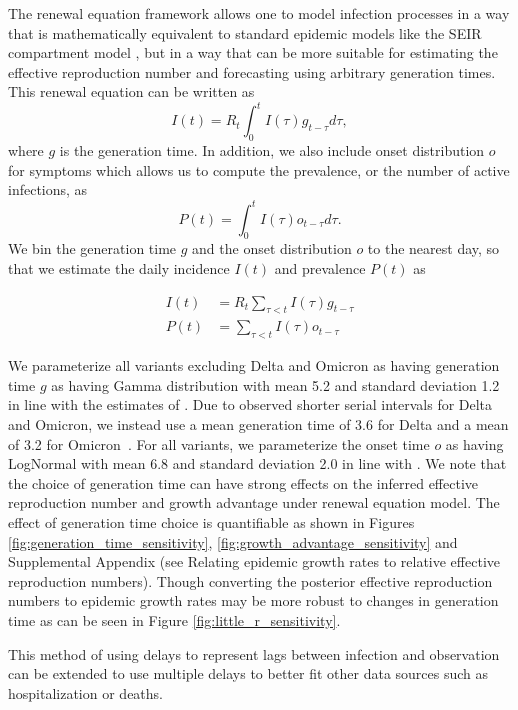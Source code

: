 \documentclass[11pt,oneside,letterpaper]{article}
\begin{document}
The renewal equation framework allows one to model infection processes in a way that is mathematically equivalent to standard epidemic models like the SEIR compartment model \cite{Champredon2018}, but in a way that can be more suitable for estimating the effective reproduction number and forecasting using arbitrary generation times. This renewal equation can be written as
\begin{equation}
  I(t) = R_{t} \int_{0}^{t} I(\tau)g_{t-\tau} d\tau,
\end{equation}
where $g$ is the generation time.
In addition, we also include onset distribution $o$ for symptoms which allows us to compute the prevalence, or the number of active infections, as
\begin{equation}
  P(t) = \int_{0}^{t} I(\tau) o_{t-\tau} d \tau.
\end{equation}
We bin the generation time $g$ and the onset distribution $o$ to the nearest day, so that we estimate the daily incidence $I(t)$ and prevalence $P(t)$ as

\begin{align}
  I(t) &= R_{t} \sum_{\tau < t} I(\tau) g_{t-\tau}\\
  P(t) &= \sum_{\tau < t} I(\tau) o_{t-\tau}
\end{align}

We parameterize all variants excluding Delta and Omicron as having generation time $g$ as having Gamma distribution with mean 5.2 and standard deviation 1.2 in line with the estimates of \cite{Ganyani2020}.
Due to observed shorter serial intervals for Delta and Omicron, we instead use a mean generation time of 3.6 for Delta and a mean of 3.2 for Omicron\ \cite{Backer2022, Ryu2022, Song2022}.
For all variants, we parameterize the onset time $o$ as having LogNormal with mean 6.8 and standard deviation 2.0 in line with \cite{Cheng2021}.
We note that the choice of generation time can have strong effects on the inferred effective reproduction number and growth advantage under renewal equation model.
The effect of generation time choice is quantifiable as shown in Figures \ref{fig:generation_time_sensitivity}, \ref{fig:growth_advantage_sensitivity} and Supplemental Appendix (see Relating epidemic growth rates to relative effective reproduction numbers).
Though converting the posterior effective reproduction numbers to epidemic growth rates may be more robust to changes in generation time as can be seen in Figure \ref{fig:little_r_sensitivity}.

This method of using delays to represent lags between infection and observation can be extended to use multiple delays to better fit other data sources such as hospitalization or deaths.
\end{document}
